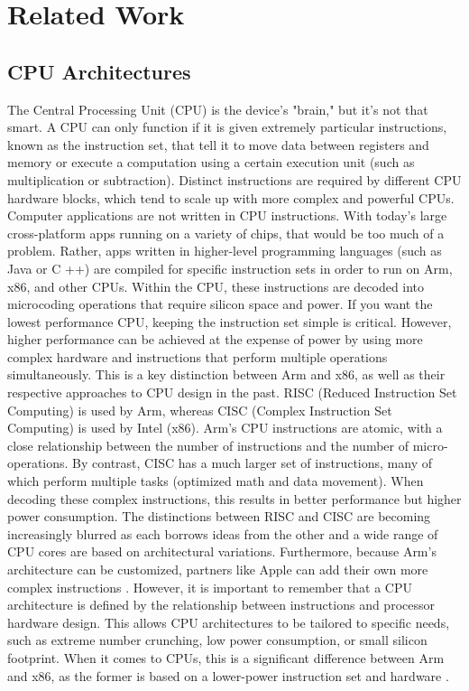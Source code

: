 \section{Related Work}

\subsection {CPU Architectures}
The Central Processing Unit (CPU) is the device's "brain," but it's not that smart. A CPU can only function if it is given extremely particular instructions, known as the instruction set, that tell it to move data between registers and memory or execute a computation using a certain execution unit (such as multiplication or subtraction). Distinct instructions are required by different CPU hardware blocks, which tend to scale up with more complex and powerful CPUs. \cite{Publikat0:online}
Computer applications are not written in CPU instructions. With today's large cross-platform apps running on a variety of chips, that would be too much of a problem. Rather, apps written in higher-level programming languages (such as Java or C ++) are compiled for specific instruction sets in order to run on Arm, x86, and other CPUs. Within the CPU, these instructions are decoded into microcoding operations that require silicon space and power. If you want the lowest performance CPU, keeping the instruction set simple is critical. However, higher performance can be achieved at the expense of power by using more complex hardware and instructions that perform multiple operations simultaneously. This is a key distinction between Arm and x86, as well as their respective approaches to CPU design in the past.\cite{CPUdesig69:online}
RISC (Reduced Instruction Set Computing) is used by Arm, whereas CISC (Complex Instruction Set Computing) is used by Intel (x86). Arm's CPU instructions are atomic, with a close relationship between the number of instructions and the number of micro-operations. By contrast, CISC has a much larger set of instructions, many of which perform multiple tasks (optimized math and data movement).\cite{RISCvers27:online} When decoding these complex instructions, this results in better performance but higher power consumption. The distinctions between RISC and CISC are becoming increasingly blurred as each borrows ideas from the other and a wide range of CPU cores are based on architectural variations. Furthermore, because Arm's architecture can be customized, partners like Apple can add their own more complex instructions \cite{ProQuest63:online}.
However, it is important to remember that a CPU architecture is defined by the relationship between instructions and processor hardware design. This allows CPU architectures to be tailored to specific needs, such as extreme number crunching, low power consumption, or small silicon footprint. When it comes to CPUs, this is a significant difference between Arm and x86, as the former is based on a lower-power instruction set and hardware \cite{Heteroge64:online}.


